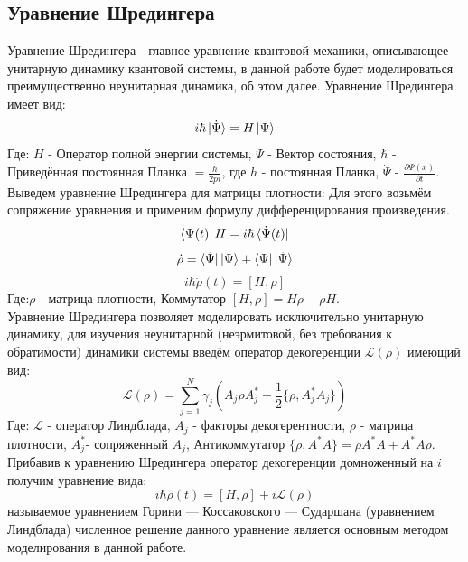 \documentclass[12pt, a4paper]{article}
\begin{document}
\subsection{Уравнение Шредингера}
\qquad Уравнение Шредингера - главное уравнение квантовой механики, описывающее унитарную динамику квантовой системы, в данной работе будет моделироваться преимущественно неунитарная динамика, об этом далее.\newline
Уравнение Шредингера имеет вид:
\[i\hbar\ket{\dot\Psi}=H\ket{\Psi}\]
Где:\newline
$H$ - Оператор полной энергии системы, \newline
$\Psi$ - Вектор состояния,\newline
$\hbar$ - Приведённая постоянная Планка $= \frac{h}{2pi}$, где $h$ - постоянная Планка,\newline
$\dot\Psi$ - $\frac{\partial \Psi(x)}{\partial t}$. \newline \null\qquad
Выведем уравнение Шредингера для матрицы плотности:\newline
Для этого возьмём сопряжение уравнения и применим формулу дифференцирования произведения.
\[\bra{\Psi(t)}H=i\hbar\bra{\dot\Psi(t)}\]
\[\dot\rho=\bra{\dot\Psi}\ket{\Psi}+\bra{\Psi}\ket{\dot\Psi}\]
\[i\hbar\dot\rho(t)=[H,\rho]\]
Где:\newline $\rho$ - матрица плотности, \newline Коммутатор $[H,\rho]=H\rho-\rho H$.\newline
\\ 
\null\qquad Уравнение Шредингера позволяет моделировать исключительно унитарную динамику, для изучения неунитарной (неэрмитовой, без требования к обратимости) динамики системы введём оператор декогеренции $\mathcal{L}(\rho)$ имеющий вид: \[\mathcal{L}(\rho)=\sum_{j=1}^N\gamma_j(A_j\rho A^*_j-\frac{1}{2}\{\rho,A_j^*A_j\})\]
Где:\newline
$\mathcal{L}$ - оператор Линдблада,\newline 
$A_j$ - факторы декогерентности,\newline 
$\rho$ - матрица плотности,\newline 
$A^*_j$- сопряженный $A_j$, \newline
Антикоммутатор $\{\rho,A^*A\}=\rho A^*A+A^* A\rho$.
\newline \null\qquad
Прибавив к уравнению Шредингера оператор декогеренции домноженный на $i$ получим уравнение вида:\[i\hbar\dot\rho(t)=[H,\rho]+i\mathcal{L}(\rho)\]
называемое уравнением Горини — Коссаковского — Сударшана (уравнением Линдблада) численное решение данного уравнение является основным методом моделирования в данной работе.
\end{document}

